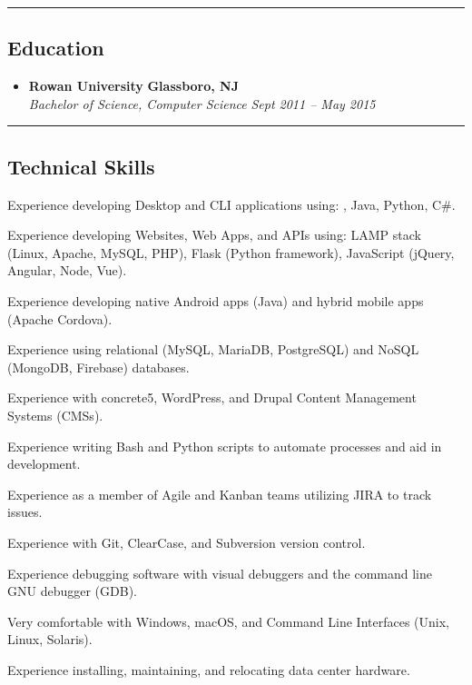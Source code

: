 \hrule
\vspace{-0.4em}
\subsection*{Education}

\begin{itemize}
  \parskip=0.1em

  \item
  \headerrow
    {\textbf{Rowan University}}
    {\textbf{Glassboro, NJ}}
  \\
  \headerrow
    {\emph{Bachelor of Science, Computer Science}}
    {\emph{Sept 2011 -- May 2015}}

\end{itemize}

\hrule
\vspace{-0.4em}
\subsection*{Technical Skills}

\begin{itemize*}
  \item Experience developing Desktop and CLI applications using: \CPP, Java, Python, C\#.
  \item Experience developing Websites, Web Apps, and APIs using: LAMP stack (Linux, Apache, MySQL, PHP), Flask (Python framework), JavaScript (jQuery, Angular, Node, Vue).
  \item Experience developing native Android apps (Java) and hybrid mobile apps (Apache Cordova).
  \item Experience using relational (MySQL, MariaDB, PostgreSQL) and NoSQL (MongoDB, Firebase) databases.
  \item Experience with concrete5, WordPress, and Drupal Content Management Systems (CMSs).
  \item Experience writing Bash and Python scripts to automate processes and aid in development.
  \item Experience as a member of Agile and Kanban teams utilizing JIRA to track issues.
  \item Experience with Git, ClearCase, and Subversion version control.
  \item Experience debugging software with visual debuggers and the command line GNU debugger (GDB).
  \item Very comfortable with Windows, macOS, and Command Line Interfaces (Unix, Linux, Solaris).
  \item Experience installing, maintaining, and relocating data center hardware.
\end{itemize*}


